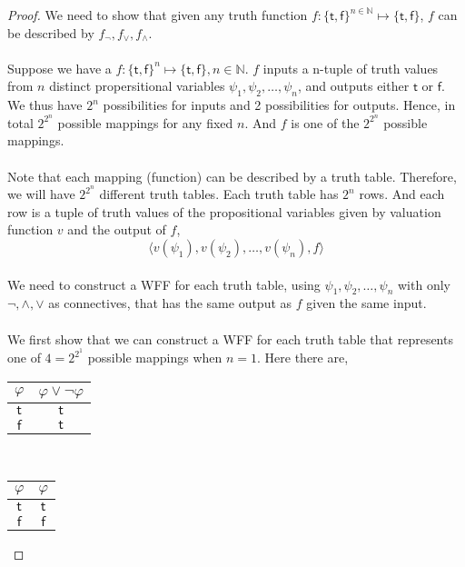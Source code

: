 \documentclass[12pt]{article}
\begin{document}
\begin{proof}
    We need to show that given any truth function $f \colon \{\mathsf{t}, \mathsf{f}\}^{n \in \mathbb{N}} \longmapsto \{\mathsf{t}, \mathsf{f}\}$, $f$ can be described by $f_{\neg},f_{\lor}, f_{\land}$.\\
    \\
    Suppose we have a $f \colon \{\mathsf{t}, \mathsf{f}\}^n \longmapsto \{\mathsf{t}, \mathsf{f}\}, n \in \mathbb{N}$.
    $f$ inputs a n-tuple of truth values from $n$ distinct propersitional variables $\psi_1, \psi_2, \dots, \psi_n$, and outputs either $\mathsf{t}$ or $\mathsf{f}$.
    We thus have $2^n$ possibilities for inputs and 2 possibilities for outputs. 
    Hence, in total $2^{2^n}$ possible mappings for any fixed $n$.
    And $f$ is one of the $2^{2^n}$ possible mappings.\\
    \\
    Note that each mapping (function) can be described by a truth table.
    Therefore, we will have $2^{2^n}$ different truth tables.
    Each truth table has $2^n$ rows.
    And each row is a tuple of truth values of the propositional variables given by valuation function $v$ and the output of $f$,
    $$\langle v(\psi_1), v(\psi_2), \dots, v(\psi_n), f \rangle$$
    \\
    We need to construct a WFF for each truth table, using $\psi_1, \psi_2, \dots, \psi_n$ with only $\neg, \land, \lor$ as connectives, that has the same output as $f$ given the same input.\\
    \\
    We first show that we can construct a WFF for each truth table that represents one of $4 = 2^{2^1}$ possible mappings when $n = 1$.
    Here there are,
    \begin{center}
        \begin{tabular}{c|c}
            $\varphi$ & $\varphi \lor \neg \varphi$\\ \hline
            $\mathsf{t}$ & $\mathsf{t}$\\
            $\mathsf{f}$ & $\mathsf{t}$\\
        \end{tabular}
        ~~~
        \begin{tabular}{c|c}
            $\varphi$ & $\varphi$ \\ \hline
            $\mathsf{t}$ & $\mathsf{t}$\\
            $\mathsf{f}$ & $\mathsf{f}$\\
        \end{tabular}

\end{center}
\end{proof}
\end{document}
